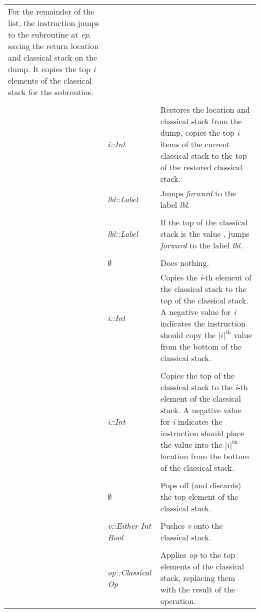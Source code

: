 {\begin{singlespace}
\begin{supertabular}{|p{.85in}|p{1.2in}|p{3.69in}|}
For the remainder of the list, the instruction jumps to the 
subroutine at \emph{ep}, saving
the return location and classical stack on the dump. It copies the
top \emph{i} elements of the classical stack for the subroutine.\\ & & \\
&\emph{i::Int}&Restores the location and classical stack from the
dump, copies the top \emph{i} items of the current classical stack to the
top of the restored classical stack.\\
\hline
{}&\emph{lbl::Label}&Jumps \emph{forward} to the label \emph{lbl}.\\ & & \\
&\emph{lbl::Label}&If the top of the classical stack is the
value , jumps \emph{forward} to the label \emph{lbl}.\\ & & \\
&$\emptyset$&Does nothing.\\
\hline
{}&\emph{i::Int}&Copies the \emph{i}-th element of the 
classical stack to the
top of the classical stack. A negative value for \emph{i} indicates the
instruction should copy the $|i|^{\text{th}}$ value from the
bottom of the classical stack.\\ & & \\
&\emph{i::Int}&Copies the top of the classical stack to the 
\emph{i}-th element of the classical stack.  A negative value for 
\emph{i} indicates the
instruction should place the value into the $|i|^{\text{th}}$ location
 from the
bottom of the classical stack.\\ & & \\
&$\emptyset$&Pops off (and discards) the top element of 
the classical stack.\\ & & \\
&\emph{v::Either Int Bool}&Pushes \emph{v} onto the classical stack.\\ & & \\
&\emph{op::Classical Op}&Applies \emph{op} to the top elements of
the classical stack, replacing them with the result of the operation.\\
\end{supertabular}
\end{singlespace}
}
